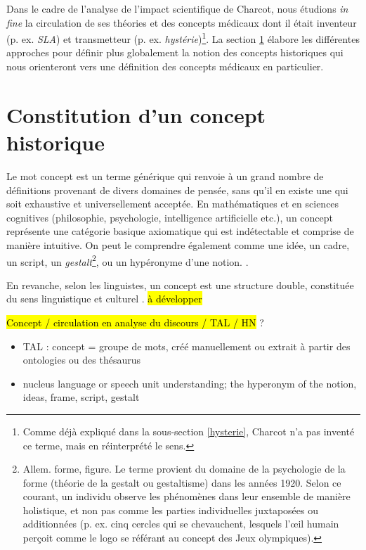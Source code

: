Dans le cadre de l'analyse de l'impact scientifique de Charcot, nous étudions \textit{in fine} la circulation de ses théories et des concepts médicaux dont il était inventeur (p. ex. \textit{SLA}) et transmetteur (p. ex. \textit{hystérie})\footnote{Comme déjà expliqué dans la sous-section \ref{hysterie}, Charcot n'a pas inventé ce terme, mais en réinterprété le sens.}. La section \ref{concept} élabore les différentes approches pour définir plus globalement la notion des concepts historiques qui nous orienteront vers une définition des concepts médicaux en particulier.

\section{Constitution d'un concept historique}
\label{concept}

Le mot \og{}concept\fg{} est un terme générique qui renvoie  à un grand nombre de définitions provenant de divers domaines de pensée, sans qu'il en existe une qui soit exhaustive et universellement acceptée. En mathématiques et en sciences cognitives (philosophie, psychologie, intelligence artificielle etc.), un concept représente une catégorie basique axiomatique qui est indétectable et comprise de manière intuitive. On peut le comprendre également comme une idée, un cadre, un script, un \textit{gestalt}\footnote{Allem. \og{}forme, figure\fg{}. Le terme provient du domaine de la psychologie de la forme (théorie de la gestalt ou gestaltisme) dans les années 1920. Selon ce courant, un individu observe les phénomènes dans leur ensemble de manière holistique, et non pas comme les parties individuelles juxtaposées ou additionnées (p. ex. cinq cercles qui se chevauchent, lesquels l'{\oe}il humain perçoit comme le logo se référant au concept des Jeux olympiques).}, ou un hypéronyme d'une notion. \citep{lihachev1997}. 

En revanche, selon les linguistes, un concept est une structure double, constituée du sens linguistique et culturel
 \citep{nemickiene2011concept}. \hl{à développer}
 
 \hl{Concept / circulation en analyse du discours / TAL / HN} ?  
\begin{itemize}
\item TAL : concept = groupe de mots, créé manuellement ou extrait à partir des ontologies ou des thésaurus
\item nucleus language or speech unit
understanding; the hyperonym of the notion, ideas, frame, script, gestalt 
\end{itemize}



